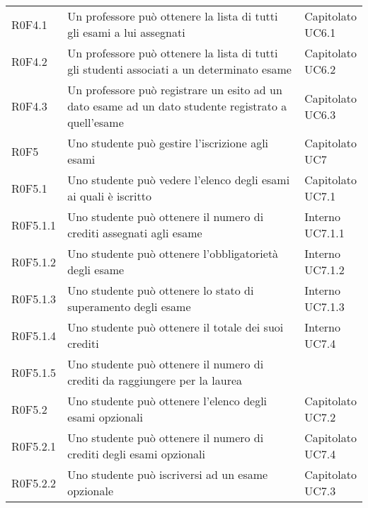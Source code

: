 \documentclass[AnalisiDeiRequisiti.tex]{subfiles}
\begin{document}
\begin{longtable}[H]{p{2cm}p{5.2cm}p{5cm}}
	R0F4.1 &  Un professore può ottenere la lista di tutti gli esami a lui assegnati & \makecell[tl]{
		Capitolato \\ 
		UC6.1
	} \\  
	R0F4.2 &  Un professore può ottenere la lista di tutti gli studenti associati a un determinato esame & \makecell[tl]{
		Capitolato  \\ 
		UC6.2
	} \\  
	R0F4.3 &  Un professore può registrare un esito ad un dato esame ad un dato studente registrato a quell'esame & \makecell[tl]{
		Capitolato \\ 
		UC6.3
	} \\  
	R0F5 &  Uno studente può gestire l'iscrizione agli esami & \makecell[tl]{
		Capitolato \\ 
		UC7
	} \\  
	R0F5.1 &  Uno studente può vedere l'elenco degli esami ai quali è iscritto & \makecell[tl]{
		Capitolato \\ 
		UC7.1
	} \\  
	R0F5.1.1 &  Uno studente può ottenere il numero di crediti assegnati agli esame & \makecell[tl]{
		Interno \\ 
		UC7.1.1
	} \\  
	R0F5.1.2 &  Uno studente può ottenere l'obbligatorietà degli esame & \makecell[tl]{
		Interno \\ 
		UC7.1.2
	} \\  
	R0F5.1.3 &  Uno studente può ottenere lo stato di superamento degli esame & \makecell[tl]{
		Interno \\ 
		UC7.1.3
	} \\  
	R0F5.1.4 &  Uno studente può ottenere il totale dei suoi crediti & \makecell[tl]{
		Interno \\ 
		UC7.4
	} \\  
	R0F5.1.5 &  Uno studente può ottenere il numero di crediti da raggiungere per la laurea & \makecell[tl]{
		Interno
	} \\  
	R0F5.2 &  Uno studente può ottenere l'elenco degli esami opzionali & \makecell[tl]{
		Capitolato \\ 
		UC7.2
	} \\  
	R0F5.2.1 &  Uno studente può ottenere il numero di crediti degli esami opzionali & \makecell[tl]{
		Capitolato \\ 
		UC7.4
	} \\  
	R0F5.2.2 &  Uno studente può iscriversi ad un esame opzionale & \makecell[tl]{
		Capitolato \\ 
		UC7.3
}
\end{longtable}
\end{document}
